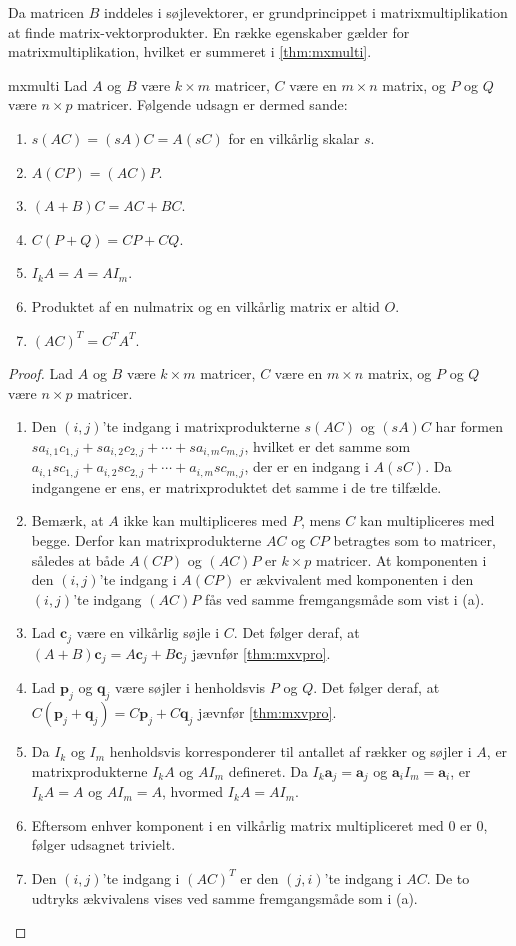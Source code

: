Da matricen $B$ inddeles i søjlevektorer, er grundprincippet i matrixmultiplikation at finde matrix-vektorprodukter.
En række egenskaber gælder for matrixmultiplikation, hvilket er summeret i \ref{thm:mxmulti}.
%
\begin{thm}{}{mxmulti}
Lad $A$ og $B$ være $k \times m$ matricer, $C$ være en $m \times n$ matrix, og $P$ og $Q$ være $n \times p$ matricer. Følgende udsagn er dermed sande:
\begin{enumerate}[label=(\alph*)]
\item $s(AC)=(sA)C=A(sC)$ for en vilkårlig skalar $s$.
\item $A(CP)=(AC)P$.
\item $(A+B)C=AC+BC$.
\item $C(P+Q)=CP+CQ$.
\item $I_kA=A=AI_m$.
\item Produktet af en nulmatrix og en vilkårlig matrix er altid $O$.
\item $(AC)^T=C^TA^T$.
\end{enumerate}
\end{thm}
%
\begin{proof}
%
Lad $A$ og $B$ være $k \times m$ matricer, $C$ være en $m \times n$ matrix, og $P$ og $Q$ være $n \times p$ matricer. 
%
\begin{enumerate}[label=(\alph*)]
\item Den $(i,j)$'te indgang i matrixprodukterne $s(AC)$ og $(sA)C$ har formen $sa_{i,1}c_{1,j} + sa_{i,2}c_{2,j} + \cdots + sa_{i,m}c_{m,j}$, hvilket er det samme som $a_{i,1}sc_{1,j} + a_{i,2}sc_{2,j} + \cdots + a_{i,m}sc_{m,j}$, der er en indgang i $A(sC)$. 
Da indgangene er ens, er matrixproduktet det samme i de tre tilfælde.
%
\item Bemærk, at $A$ ikke kan multipliceres med $P$, mens $C$ kan multipliceres med begge. 
Derfor kan matrixprodukterne $AC$ og $CP$ betragtes som to matricer, således at både $A(CP)$ og $(AC)P$ er $k \times p$ matricer. 
At komponenten i den $(i,j)$'te indgang i $A(CP)$ er ækvivalent med komponenten i den $(i,j)$'te indgang $(AC)P$ fås ved samme fremgangsmåde som vist i (a). 
%
\item Lad $\textbf{c}_j$ være en vilkårlig søjle i $C$. 
Det følger deraf, at $(A+B)\textbf{c}_j=A\textbf{c}_j+B\textbf{c}_j$ jævnfør \ref{thm:mxvpro}.
% 
\item  Lad $\textbf{p}_j$ og $\textbf{q}_j$ være søjler i henholdsvis $P$ og $Q$. Det følger deraf, at $C(\textbf{p}_j+\textbf{q}_j)=C\textbf{p}_j+C\textbf{q}_j$ jævnfør \ref{thm:mxvpro}. 
%
\item Da $I_k$ og $I_m$ henholdsvis korresponderer til antallet af rækker og søjler i $A$, er matrixprodukterne $I_kA$ og $AI_m$ defineret. 
Da $I_k\textbf{a}_j=\textbf{a}_j$ og $\textbf{a}_iI_m=\textbf{a}_i$, er $I_kA=A$ og $AI_m=A$, hvormed $I_kA=AI_m$.
%
\item Eftersom enhver komponent i en vilkårlig matrix multipliceret med $0$ er $0$, følger udsagnet trivielt. 
%
\item Den $(i,j)$'te indgang i $(AC)^T$ er den $(j,i)$'te indgang i $AC$. De to udtryks ækvivalens vises ved samme fremgangsmåde som i (a).
\end{enumerate}
\end{proof}